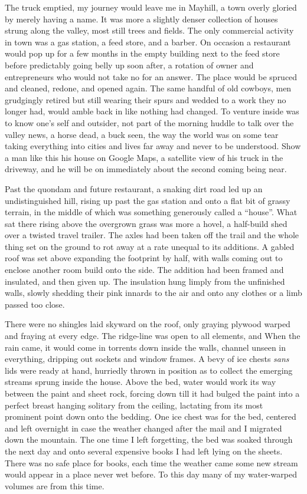 \documentclass[ebook, 10pt, openright, onecolumn]{memoir}
\begin{document}
The truck emptied, my journey would leave me in Mayhill, a town overly gloried
by merely having a name.  It was more a slightly denser collection of houses
strung along the valley, most still trees and fields.  The only commercial
activity in town was a gas station, a feed store, and a barber.  On occasion a
restaurant would pop up for a few months in the empty building next to the feed
store before predictably going belly up soon after, a rotation of owner and
entrepreneurs who would not take no for an answer.  The place would be spruced
and cleaned, redone, and opened again.  The same handful of old cowboys, men
grudgingly retired but still wearing their spurs and wedded to a work they no
longer had, would amble back in like nothing had changed.  To venture inside was
to know one's self and outsider, not part of the morning huddle to talk over the
valley news, a horse dead, a buck seen, the way the world was on some tear
taking everything into cities and lives far away and never to be understood.
Show a man like this his house on Google Maps, a satellite view of his truck in
the driveway, and he will be on immediately about the second coming being near.

Past the quondam and future restaurant, a snaking dirt road led up an
undistinguished hill, rising up past the gas station and onto a flat bit of
grassy terrain, in the middle of which was something generously called a
``house''. What sat there rising above the overgrown grass was more a hovel, a
half-build shed over a twisted travel trailer.  The axles had been taken off the
trail and the whole thing set on the ground to rot away at a rate unequal to its
additions.  A gabled roof was set above expanding the footprint by half, with
walls coming out to enclose another room build onto the side.  The addition had
been framed and insulated, and then given up.  The insulation hung limply from
the unfinished walls, slowly shedding their pink innards to the air and onto any
clothes or a limb passed too close.

There were no shingles laid skyward on the roof, only graying plywood warped
and fraying at every edge.  The ridge-line was open to all elements, and When
the rain came, it would come in torrents down inside the walls, channel unseen
in everything, dripping out sockets and window frames.  A bevy of ice chests
\textit{sans} lids were ready at hand, hurriedly thrown in position as to
collect the emerging streams sprung inside the house.  Above the bed, water
would work its way between the paint and sheet rock, forcing down till it had
bulged the paint into a perfect breast hanging solitary from the ceiling,
lactating from its most prominent point down onto the bedding.  One ice chest
was for the bed, centered and left overnight in case the weather changed after
the mail and I migrated down the mountain.  The one time I left forgetting, the
bed was soaked through the next day and onto several expensive books I had left
lying on the sheets.  There was no safe place for books, each time the weather
came some new stream would appear in a place never wet before.  To this day many
of my water-warped volumes are from this time. 
\end{document}
